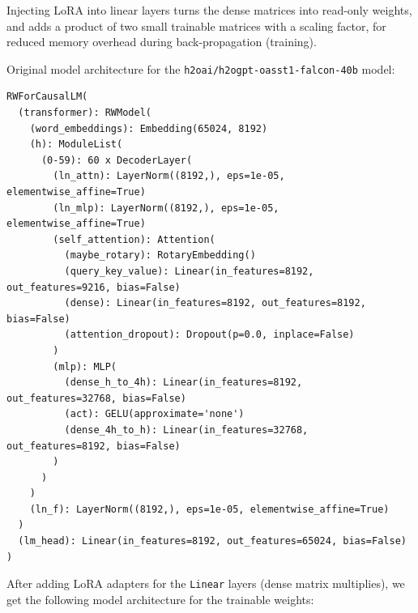 \documentclass{article}
\begin{document}
Injecting LoRA into linear layers turns the dense matrices into read-only weights, and adds a product of two small trainable matrices with a scaling factor, for reduced memory overhead during back-propagation (training).

Original model architecture for the \texttt{h2oai/h2ogpt-oasst1-falcon-40b} model:
\begin{small}
\begin{verbatim}
RWForCausalLM(
  (transformer): RWModel(
    (word_embeddings): Embedding(65024, 8192)
    (h): ModuleList(
      (0-59): 60 x DecoderLayer(
        (ln_attn): LayerNorm((8192,), eps=1e-05, elementwise_affine=True)
        (ln_mlp): LayerNorm((8192,), eps=1e-05, elementwise_affine=True)
        (self_attention): Attention(
          (maybe_rotary): RotaryEmbedding()
          (query_key_value): Linear(in_features=8192, out_features=9216, bias=False)
          (dense): Linear(in_features=8192, out_features=8192, bias=False)
          (attention_dropout): Dropout(p=0.0, inplace=False)
        )
        (mlp): MLP(
          (dense_h_to_4h): Linear(in_features=8192, out_features=32768, bias=False)
          (act): GELU(approximate='none')
          (dense_4h_to_h): Linear(in_features=32768, out_features=8192, bias=False)
        )
      )
    )
    (ln_f): LayerNorm((8192,), eps=1e-05, elementwise_affine=True)
  )
  (lm_head): Linear(in_features=8192, out_features=65024, bias=False)
)
\end{verbatim}
\end{small}
After adding LoRA adapters for the \texttt{Linear} layers (dense matrix multiplies), we get the following model architecture for the trainable weights:
\end{document}
